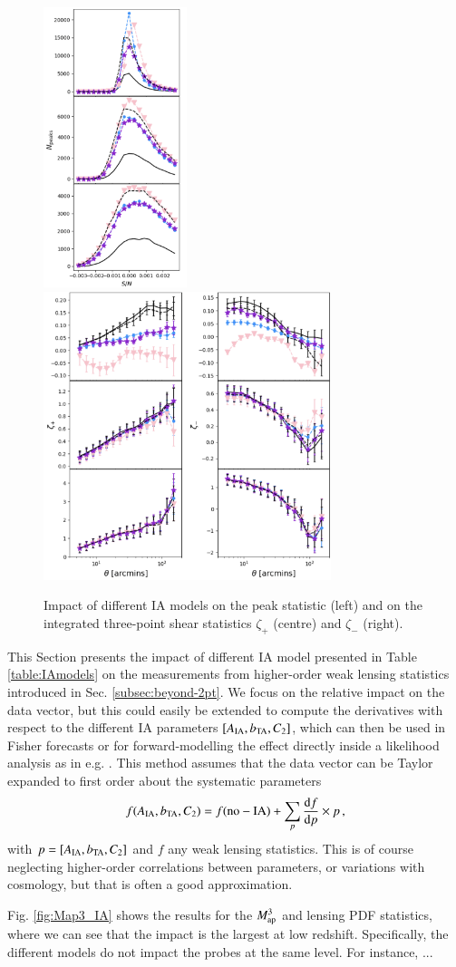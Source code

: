 \begin{figure}
\includegraphics[width=1.65in]{graphs/Peaks_IA}
\includegraphics[width=3.3in]{graphs/i3PCF}
\caption{Impact of different IA models on the peak statistic (left) and on the integrated three-point shear statistics $\zeta_+$ (centre) and $\zeta_-$ (right).}
\label{fig:I3PCF}
\end{figure}


This Section presents the impact of different IA model presented in Table \ref{table:IAmodels} on the measurements from higher-order weak lensing statistics introduced in Sec. \ref{subsec:beyond-2pt}. We focus on the relative impact on the data vector, but this could easily be extended to compute the derivatives with respect to the different IA parameters $[A_{\rm IA}, b_{\rm TA}, C_2]$, which can then be used in Fisher forecasts or for forward-modelling the effect directly inside  a likelihood analysis  as in e.g. \citet{DESY1_Heydenreich, KiDS1000_Burger, KiDS1000_JHD}. This method assumes that the data vector can be Taylor expanded to first order about the systematic parameters  
\begin{eqnarray}
f(A_{\rm IA},b_{\rm TA},C_2) = f({\rm no-IA}) +  \sum_p \frac{{\rm d}f}{{\rm d}p}\times p \, ,
\end{eqnarray}
with $ p=[A_{\rm IA}, b_{\rm TA}, C_2]$ and $f$ any weak lensing statistics. This is of course  neglecting higher-order correlations between parameters, or variations with cosmology, but that is often a good approximation. 

Fig. \ref{fig:Map3_IA} shows the results for the $M_{\rm ap}^3$  and lensing PDF  statistics, where we can see that the impact is the largest at low redshift. Specifically, the different models do not impact the probes at the same level. For instance, ...